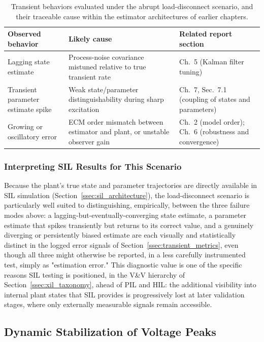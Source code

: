 \begin{table}[htbp]
	\centering
	\caption{Transient behaviors evaluated under the abrupt load-disconnect scenario, and their traceable cause within the estimator architectures of earlier chapters.}
	\label{tab:load_disconnect_modes}
	\begin{tabular}{p{3.4cm}p{4.6cm}p{4.6cm}}
		\toprule
		Observed behavior & Likely cause & Related report section \\
		\midrule
		Lagging state estimate & Process-noise covariance mistuned relative to true transient rate & Ch.~5 (Kalman filter tuning) \\
		Transient parameter estimate spike & Weak state/parameter distinguishability during sharp excitation & Ch.~7, Sec.~7.1 (coupling of states and parameters) \\
		Growing or oscillatory error & ECM order mismatch between estimator and plant, or unstable observer gain & Ch.~2 (model order); Ch.~6 (robustness and convergence) \\
		\bottomrule
	\end{tabular}
\end{table}

\subsubsection{Interpreting SIL Results for This Scenario}

Because the plant's true state and parameter trajectories are directly available in SIL simulation (Section~\ref{ssec:sil_architecture}), the load-disconnect scenario is particularly well suited to distinguishing, empirically, between the three failure modes above: a lagging-but-eventually-converging state estimate, a parameter estimate that spikes transiently but returns to its correct value, and a genuinely diverging or persistently biased estimate are each visually and statistically distinct in the logged error signals of Section~\ref{ssec:transient_metrics}, even though all three might otherwise be reported, in a less carefully instrumented test, simply as "estimation error." This diagnostic value is one of the specific reasons SIL testing is positioned, in the V\&V hierarchy of Section~\ref{ssec:xil_taxonomy}, ahead of PIL and HIL: the additional visibility into internal plant states that SIL provides is progressively lost at later validation stages, where only externally measurable signals remain accessible.

\subsection{Dynamic Stabilization of Voltage Peaks}
\label{ssec:voltage_peak_stabilization}

